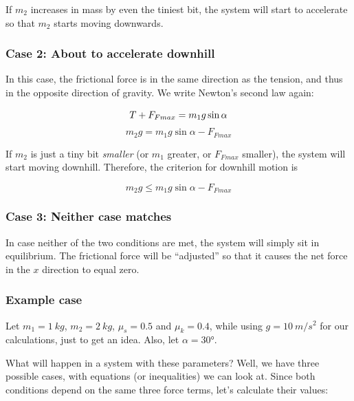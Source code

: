 \documentclass[12pt,a4paper]{report}
\begin{document}
If $m_2$ increases in mass by even the tiniest bit, the system will start to accelerate so that $m_2$ starts moving downwards.

\subsubsection{Case 2: About to accelerate downhill}

In this case, the frictional force is in the same direction as the tension, and thus in the opposite direction of gravity. We write Newton's second law again:

\begin{equation}
T + F_{Fmax} = m_1 g \sin \alpha\\
\end{equation}
\begin{equation}
m_2 g = m_1 g \sin \alpha - F_{Fmax}
\end{equation}

If $m_2$ is just a tiny bit \emph{smaller} (or $m_1$ greater, or $F_{Fmax}$ smaller), the system will start moving downhill. Therefore, the criterion for downhill motion is

\begin{equation}
m_2 g \le m_1 g \sin \alpha - F_{Fmax}
\end{equation}

\subsubsection{Case 3: Neither case matches}

In case neither of the two conditions are met, the system will simply sit in equilibrium. The frictional force will be ``adjusted'' so that it causes the net force in the $x$ direction to equal zero.

\subsubsection{Example case}

Let $m_1 = \SI{1}{kg}$, $m_2 = \SI{2}{kg}$, $\mu_s = 0.5$ and $\mu_k = 0.4$, while using $g = \SI{10}{m/s^2}$ for our calculations, just to get an idea. Also, let $\alpha = \ang{30}$.

What will happen in a system with these parameters? Well, we have three possible cases, with equations (or inequalities) we can look at. Since both conditions depend on the same three force terms, let's calculate their values:
\end{document}
